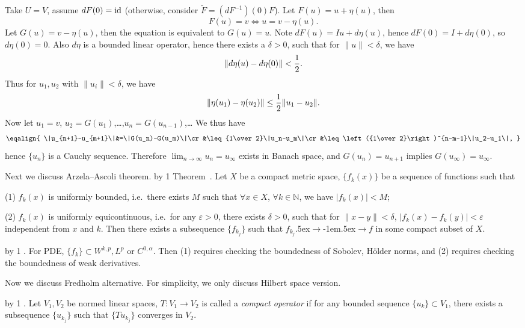\demo
Take $U=V$, assume $dF(0)={\rm id}$ (otherwise, consider $\tilde{F}=(dF^{-1})(0)F$).
Let $F(u)=u+\eta(u)$, then
$$F(u)=v\iff u=v-\eta(u).$$
Let $G(u)=v-\eta(u)$, then the equation is equivalent to $G(u)=u$.
Note $dF(u)=Iu+d\eta(u)$, hence $dF(0)=I+d\eta(0)$, so $d\eta(0)=0$.
Also $d\eta$ is a bounded linear operator, hence there exists a $\delta>0$, such that for $\|u\|<\delta$, we have
$$\|d\eta(u)-d\eta(0)\|<{1\over2}.$$
Thus for $u_1,u_2$ with $\|u_i\|<\delta$, we have
$$\|\eta(u_1)-\eta(u_2)\|\leq{1\over2}\|u_1-u_2\|.$$
Now let $u_1=v$, $u_2=G(u_1)$,\dots,$u_n=G(u_{n-1})$,\dots
We thus have
$$\eqalign{
	\|u_{n+1}-u_{m+1}\|&=\|G(u_n)-G(u_m)\|\cr
	&\leq{1\over2}\|u_n-u_m\|\cr
	&\leq\left({1\over2}\right)^{n-m-1}\|u_2-u_1\|,
}$$
hence $\{u_n\}$ is a Cauchy sequence.
Therefore $\lim_{n\to\infty}u_n=u_\infty$ exists in Banach space, and $G(u_n)=u_{n+1}$ implies $G(u_\infty)=u_\infty$.
\enddemo

Next we discuss Arzela--Ascoli theorem.
\advance\propcount by 1
\proclaim Theorem~\propnumber.
Let $X$ be a compact metric space, $\{f_k(x)\}$ be a sequence of functions such that
\smallskip
\item {(1)} $f_k(x)$ is uniformly bounded, i.e.\ there exists $M$ such that $\forall x\in X$, $\forall k\in\mathbb{N}$, we have $|f_k(x)|<M$;
\item {(2)} $f_k(x)$ is uniformly equicontinuous, i.e.\ for any $\varepsilon>0$, there exists $\delta>0$, such that for $\|x-y\|<\delta$, $|f_k(x)-f_k(y)|<\varepsilon$ independent from $x$ and $k$.
\smallskip
Then there exists a subsequence $\{f_{k_j}\}$ such that $f_{k_j}${\raise .5ex\hbox{$\to$}}{\kern -1em\lower .5ex\hbox{$\to$}}$f$ in some compact subset of $X$.
\medskip

\advance\propcount by 1
.
For PDE, $\{f_k\}\subset W^{k,p},L^p$ or $C^{0,\alpha}$.
Then (1) requires checking the boundedness of Sobolev, H\"older norms, and (2) requires checking the boundedness of weak derivatives.
\medskip

Now we discuss Fredholm alternative.
For simplicity, we only discuss Hilbert space version.
\medskip

\advance\propcount by 1
.
Let $V_1,V_2$ be normed linear spaces, $T:V_1\to V_2$ is called a {\it compact operator} if for any bounded sequence $\{u_k\}\subset V_1$, there exists a subsequence $\{u_{k_j}\}$ such that $\{Tu_{k_j}\}$ converges in $V_2$.
\medskip

